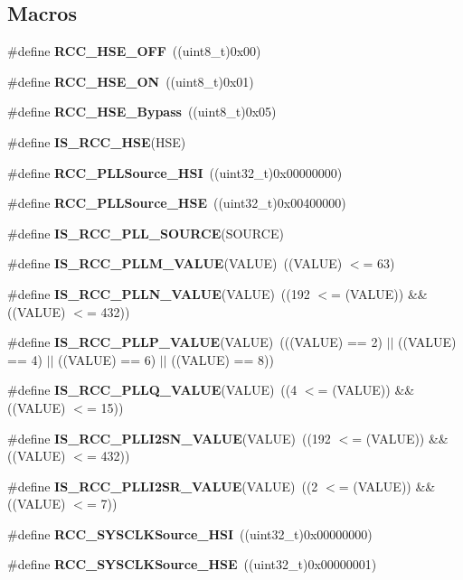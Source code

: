 \subsection*{Macros}
\begin{DoxyCompactItemize}
\item 
\#define \textbf{ R\+C\+C\+\_\+\+H\+S\+E\+\_\+\+O\+FF}~((uint8\+\_\+t)0x00)
\item 
\#define \textbf{ R\+C\+C\+\_\+\+H\+S\+E\+\_\+\+ON}~((uint8\+\_\+t)0x01)
\item 
\#define \textbf{ R\+C\+C\+\_\+\+H\+S\+E\+\_\+\+Bypass}~((uint8\+\_\+t)0x05)
\item 
\#define \textbf{ I\+S\+\_\+\+R\+C\+C\+\_\+\+H\+SE}(H\+SE)
\item 
\#define \textbf{ R\+C\+C\+\_\+\+P\+L\+L\+Source\+\_\+\+H\+SI}~((uint32\+\_\+t)0x00000000)
\item 
\#define \textbf{ R\+C\+C\+\_\+\+P\+L\+L\+Source\+\_\+\+H\+SE}~((uint32\+\_\+t)0x00400000)
\item 
\#define \textbf{ I\+S\+\_\+\+R\+C\+C\+\_\+\+P\+L\+L\+\_\+\+S\+O\+U\+R\+CE}(S\+O\+U\+R\+CE)
\item 
\#define \textbf{ I\+S\+\_\+\+R\+C\+C\+\_\+\+P\+L\+L\+M\+\_\+\+V\+A\+L\+UE}(V\+A\+L\+UE)~((V\+A\+L\+UE) $<$= 63)
\item 
\#define \textbf{ I\+S\+\_\+\+R\+C\+C\+\_\+\+P\+L\+L\+N\+\_\+\+V\+A\+L\+UE}(V\+A\+L\+UE)~((192 $<$= (V\+A\+L\+UE)) \&\& ((V\+A\+L\+UE) $<$= 432))
\item 
\#define \textbf{ I\+S\+\_\+\+R\+C\+C\+\_\+\+P\+L\+L\+P\+\_\+\+V\+A\+L\+UE}(V\+A\+L\+UE)~(((V\+A\+L\+UE) == 2) $\vert$$\vert$ ((V\+A\+L\+UE) == 4) $\vert$$\vert$ ((V\+A\+L\+UE) == 6) $\vert$$\vert$ ((V\+A\+L\+UE) == 8))
\item 
\#define \textbf{ I\+S\+\_\+\+R\+C\+C\+\_\+\+P\+L\+L\+Q\+\_\+\+V\+A\+L\+UE}(V\+A\+L\+UE)~((4 $<$= (V\+A\+L\+UE)) \&\& ((V\+A\+L\+UE) $<$= 15))
\item 
\#define \textbf{ I\+S\+\_\+\+R\+C\+C\+\_\+\+P\+L\+L\+I2\+S\+N\+\_\+\+V\+A\+L\+UE}(V\+A\+L\+UE)~((192 $<$= (V\+A\+L\+UE)) \&\& ((V\+A\+L\+UE) $<$= 432))
\item 
\#define \textbf{ I\+S\+\_\+\+R\+C\+C\+\_\+\+P\+L\+L\+I2\+S\+R\+\_\+\+V\+A\+L\+UE}(V\+A\+L\+UE)~((2 $<$= (V\+A\+L\+UE)) \&\& ((V\+A\+L\+UE) $<$= 7))
\item 
\#define \textbf{ R\+C\+C\+\_\+\+S\+Y\+S\+C\+L\+K\+Source\+\_\+\+H\+SI}~((uint32\+\_\+t)0x00000000)
\item 
\#define \textbf{ R\+C\+C\+\_\+\+S\+Y\+S\+C\+L\+K\+Source\+\_\+\+H\+SE}~((uint32\+\_\+t)0x00000001)
$$
\end{DoxyCompactItemize}
